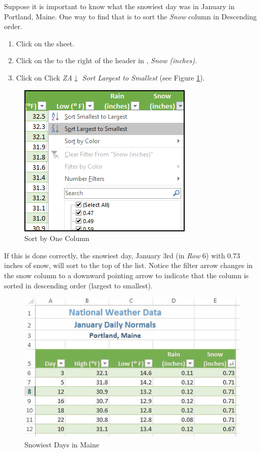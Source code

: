 Suppose it is important to know what the snowiest day was in January in Portland, Maine. One way to find that is to sort the \textit{Snow} column in Descending order.

\begin{enumerate}
	\item Click on the  sheet.
	\item Click on the  to the right of the header in , \textit{Snow (inches)}.
	\item Click on Click \textit{ZA$ \downarrow $ Sort Largest to Smallest} (see Figure \ref{05:fig08}).
\end{enumerate}

\begin{figure}[H]
	\centering
	\includegraphics[width=\maxwidth{.65\linewidth}]{gfx/ch05_fig08}
	\caption{Sort by One Column}
	\label{05:fig08}
\end{figure}

If this is done correctly, the snowiest day, January 3rd (in \textit{Row} $ 6 $) with $ 0.73 $ inches of snow, will sort to the top of the list. Notice the filter arrow changes in the snow column to a downward pointing arrow to indicate that the column is sorted in descending order (largest to smallest).

\begin{figure}[H]
	\centering
	\includegraphics[width=\maxwidth{.95\linewidth}]{gfx/ch05_fig09}
	\caption{Snowiest Days in Maine}
	\label{05:fig09}
\end{figure}

